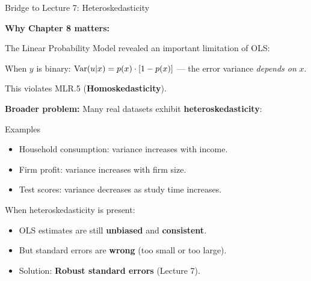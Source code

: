 \documentclass[aspectratio=169, 12pt]{beamer}
\begin{document}
\begin{frame}[shrink=25]{Bridge to Lecture 7: Heteroskedasticity}

  \textbf{Why Chapter 8 matters:}

  The Linear Probability Model revealed an important limitation of OLS:

  \vspace{-0.3cm}

  \begin{highlightbox}
    When $y$ is binary: $\operatorname{Var}(u | x) = p(x) \cdot [1 - p(x)]$ — the error variance \textit{depends on} $x$.

    This violates MLR.5 (\textbf{Homoskedasticity}).
  \end{highlightbox}

  \medskip

  \textbf{Broader problem:} Many real datasets exhibit \textbf{heteroskedasticity}:

  \begin{examplebox}{Examples}
    \begin{itemize}
      \item Household consumption: variance increases with income.
      \item Firm profit: variance increases with firm size.
      \item Test scores: variance decreases as study time increases.
    \end{itemize}
  \end{examplebox}

  \medskip

  \begin{keybox}
    When heteroskedasticity is present:
    \begin{itemize}
      \item OLS estimates are still \textbf{unbiased} and \textbf{consistent}.
      \item But standard errors are \textbf{wrong} (too small or too large).
      \item Solution: \textbf{Robust standard errors} (Lecture 7).
    \end{itemize}
  \end{keybox}

\end{frame}

\end{document}
